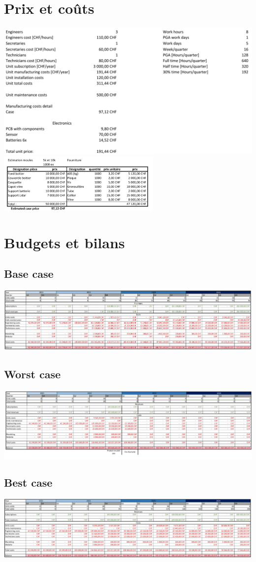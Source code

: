 \documentclass[11pt,titlepage]{report}
\begin{document}
\section{Prix et coûts}
\includegraphics[width=\textwidth]{Images/business/costs.png} \\[1cm]
\includegraphics[width=0.6\textwidth]{Images/business/case_price.PNG}
\newpage
\section{Budgets et bilans}
\subsection{Base case}
\includegraphics[angle=90, height=\textheight]{Images/business/base.png}
\subsection{Worst case}
\includegraphics[angle=90, height=\textheight]{Images/business/worst.png}
\subsection{Best case}
\includegraphics[angle=90, height=\textheight]{Images/business/best.png}
\end{document}
